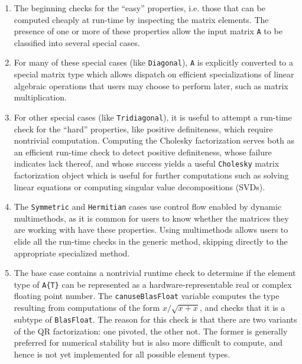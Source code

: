 \documentclass[10pt, preprint]{sigplanconf}
\begin{document}
\begin{enumerate}
\item The beginning checks for the ``easy'' properties, i.e.  those that can be
	computed cheaply at run-time by inspecting the matrix elements. The
	presence of one or more of these properties allow the input matrix
	\verb|A| to be classified into several special cases.

\item For many of these special cases (like \verb|Diagonal|), \verb|A| is
	explicitly converted to a special matrix type which allows dispatch on
	efficient specializations of linear algebraic operations that users may
	choose to perform later, such as matrix multiplication.
	
\item For other special cases (like \verb|Tridiagonal|), it is useful to
	attempt a run-time check for the ``hard'' properties, like positive
	definiteness, which require nontrivial computation. Computing the
	Cholesky factorization serves both as an efficient run-time check to
	detect positive definiteness, whose failure indicates lack thereof, and
	whose success yields a useful \verb|Cholesky| matrix factorization
	object which is useful for further computations such as solving linear
	equations or computing singular value decompositions (SVDs).

\item The \verb|Symmetric| and \verb|Hermitian| cases use control flow
	enabled by dynamic multimethods, as it is common for users to know
	whether the matrices they are working with have these properties.
	Using multimethods allows users to elide all the run-time checks
	in the generic method, skipping directly to the appropriate specialized
	method.

\item The base case contains a nontrivial runtime check to determine if the
	element type of \verb|A{T}| can be represented as a
	hardware-representable real or complex floating point number. The
	\verb|canuseBlasFloat| variable computes the type resulting from
	computations of the form $x / \sqrt{x + x}$, and checks that it is a
	subtype of \verb|BlasFloat|. The reason for this check is that there
	are two variants of the QR factorization: one pivoted, the other not.
	The former is generally preferred for numerical stability but is also
	more difficult to compute, and hence is not yet
	implemented for all possible element types.

\end{enumerate}
\end{document}
